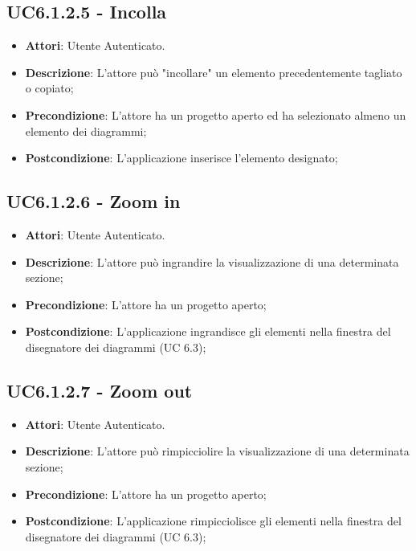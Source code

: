 \subsection{UC6.1.2.5 - Incolla} 
\label{ssec:UC6.1.2.5} 
\begin{itemize} 
\item \textbf{Attori}: Utente Autenticato.
\item \textbf{Descrizione}: L’attore può "incollare" un elemento precedentemente tagliato o copiato;
\item \textbf{Precondizione}: L’attore ha un progetto aperto ed ha selezionato almeno un elemento dei diagrammi;
\item \textbf{Postcondizione}: L’applicazione inserisce l’elemento designato;
\end{itemize} 
\subsection{UC6.1.2.6 - Zoom in} 
\label{ssec:UC6.1.2.6} 
\begin{itemize} 
\item \textbf{Attori}: Utente Autenticato.
\item \textbf{Descrizione}: L’attore può ingrandire la visualizzazione di una determinata sezione;
\item \textbf{Precondizione}: L’attore ha un progetto aperto;
\item \textbf{Postcondizione}: L’applicazione ingrandisce gli elementi nella finestra del disegnatore dei diagrammi (UC 6.3);
\end{itemize} 
\subsection{UC6.1.2.7 - Zoom out} 
\label{ssec:UC6.1.2.7} 
\begin{itemize} 
\item \textbf{Attori}: Utente Autenticato.
\item \textbf{Descrizione}: L’attore può rimpicciolire la visualizzazione di una determinata sezione;
\item \textbf{Precondizione}: L’attore ha un progetto aperto;
\item \textbf{Postcondizione}: L’applicazione rimpicciolisce gli elementi nella finestra del disegnatore dei diagrammi (UC 6.3);
\end{itemize} 
